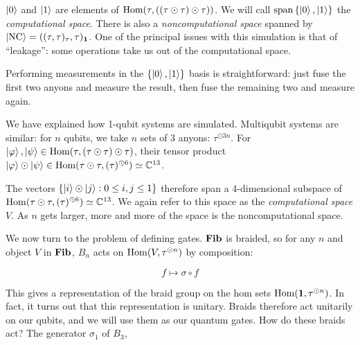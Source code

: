 $\left|0\right>$ and $\left|1\right>$ are elements of $\operatorname{Hom}(\tau, ((\tau \odot \tau)\odot
\tau))$. We will call $\operatorname{span}\left\{ \left|0\right>, \left|1\right> \right\}$
the \emph{computational space}. There is also a \emph{noncomputational space}
spanned by $\left|\text{NC}\right> = ((\tau,\tau)_\tau,
\tau)_{\mathbf{1}}$. One of the principal issues with this simulation is that of
``leakage'': some operations take us out of the computational space. 

Performing measurements in the $\left\{ \left|0\right>, \left|1\right> \right\}$ basis is
straightforward: just fuse the first two anyons and measure the result, then
fuse the remaining two and measure again.

We have explained how 1-qubit systems are simulated. Multiqubit systems are
similar: for $n$ qubits, we take $n$ sets of $3$ anyons: $\tau^{\odot 3n}$.
For $\left|\varphi\right>,\left|\psi\right>\in \operatorname{Hom}(\tau,(\tau \odot \tau) \odot \tau)$,
their tensor product $\left|\varphi\right> \odot \left|\psi\right> \in \operatorname{Hom}(\tau \odot
\tau, (\tau)^{\odot 6}) \simeq \mathbb{C}^{13}$. 

The vectors $\left\{ \left|i\right>\odot \left|j\right> : 0 \leq i,j\leq 1 \right\}$
therefore span a 4-dimensional subspace of $\operatorname{Hom}(\tau \odot \tau, (\tau)^{\odot
6}) \simeq \mathbb{C}^{13}$. We again refer to this space as the
\emph{computational space} $V$. As $n$ gets larger, more and more of the space
is the noncomputational space. 

We now turn to the problem of defining gates. $\mathbf{Fib}$ is braided, so for any $n$
and object $V$ in $\mathbf{Fib}$, $B_n$ acts on $\operatorname{Hom}(V, \tau^{\odot n})$ by
composition: 

\begin{equation}
f \mapsto \sigma \circ f
\end{equation}

This gives a representation of the braid group on the hom sets $\operatorname{Hom}(\mathbf{1},
\tau^{\odot n})$. In fact, it turns out that this representation is unitary.
Braids therefore act unitarily on our qubits, and we will use them as our
quantum gates. How do these braids act? The generator $\sigma_1$ of $B_3$,

